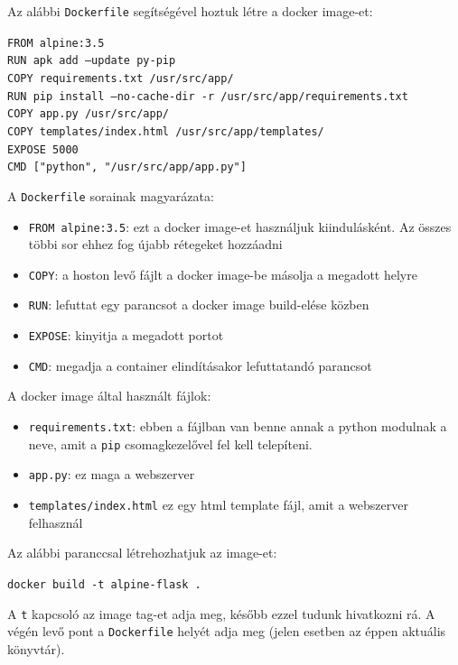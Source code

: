 \documentclass[]{article}
\numberwithin{equation}{section}
\begin{document}
Az alábbi \texttt{Dockerfile} segítségével hoztuk létre a docker image-et:

\texttt{FROM alpine:3.5\\
	RUN apk add --update py-pip\\
	COPY requirements.txt /usr/src/app/\\
	RUN pip install --no-cache-dir -r /usr/src/app/requirements.txt\\
	COPY app.py /usr/src/app/\\
	COPY templates/index.html /usr/src/app/templates/\\
	EXPOSE 5000\\
	CMD ["python", "/usr/src/app/app.py"]}

A \texttt{Dockerfile} sorainak magyarázata:

\begin{itemize}
	\item \texttt{FROM alpine:3.5}: ezt a docker image-et használjuk kiindulásként. Az összes többi sor ehhez fog újabb rétegeket hozzáadni
	\item \texttt{COPY}: a hoston levő fájlt a docker image-be másolja a megadott helyre
	\item \texttt{RUN}: lefuttat egy parancsot a docker image build-elése közben
	\item \texttt{EXPOSE}: kinyitja a megadott portot
	\item \texttt{CMD}: megadja a container elindításakor lefuttatandó parancsot
\end{itemize}

A docker image által használt fájlok:

\begin{itemize}
	\item \texttt{requirements.txt}: ebben a fájlban van benne annak a python modulnak a neve, amit a \texttt{pip} csomagkezelővel fel kell telepíteni.
	\item \texttt{app.py}: ez maga a webszerver
	\item \texttt{templates/index.html} ez egy html template fájl, amit a webszerver felhasznál
\end{itemize}

Az alábbi paranccsal létrehozhatjuk az image-et:

\texttt{docker build -t alpine-flask .}

A \texttt{t} kapcsoló az image tag-et adja meg, később ezzel tudunk hivatkozni rá. A végén levő pont a \texttt{Dockerfile} helyét adja meg (jelen esetben az éppen aktuális könyvtár).
\end{document}
